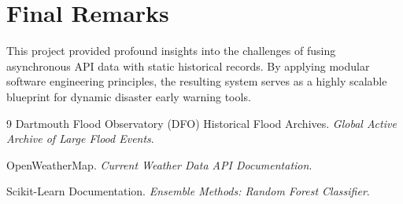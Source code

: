 \documentclass[12pt,a4paper]{report}
\begin{document}
\section{Final Remarks}
This project provided profound insights into the challenges of fusing asynchronous API data with static historical records. By applying modular software engineering principles, the resulting system serves as a highly scalable blueprint for dynamic disaster early warning tools.

\renewcommand{\bibname}{Bibliography}
\begin{thebibliography}{9}
    Dartmouth Flood Observatory (DFO) Historical Flood Archives. \textit{Global Active Archive of Large Flood Events}.
    
    OpenWeatherMap. \textit{Current Weather Data API Documentation}.
    
    Scikit-Learn Documentation. \textit{Ensemble Methods: Random Forest Classifier}.
\end{thebibliography}
\end{document}
